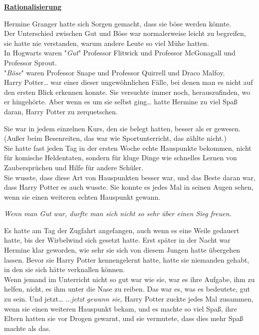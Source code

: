 

\hypertarget{rationalisierung}{%

\textbf{\uline{Rationalisierung}}

Hermine Granger hatte sich Sorgen gemacht, dass sie böse werden könnte.\\ Der Unterschied zwischen Gut und Böse war normalerweise leicht zu begreifen, sie hatte nie verstanden, warum andere Leute so viel Mühe hatten.\\ In Hogwarts waren "\emph{Gut}" Professor Flitwick und Professor McGonagall und Professor Sprout.\\ "\emph{Böse}" waren Professor Snape und Professor Quirrell und Draco Malfoy.\\ Harry Potter… war einer dieser ungewöhnlichen Fälle, bei denen man es nicht auf den ersten Blick erkennen konnte. Sie versuchte immer noch, herauszufinden, wo er hingehörte. Aber wenn es um sie selbst ging… hatte Hermine zu viel Spaß daran, Harry Potter zu zerquetschen.

Sie war in jedem einzelnen Kurs, den sie belegt hatten, besser als er gewesen.\\ (Außer beim Besenreiten, das war wie Sportunterricht, das zählte nicht.)\\ Sie hatte fast jeden Tag in der ersten Woche echte Hauspunkte bekommen, nicht für komische Heldentaten, sondern für kluge Dinge wie schnelles Lernen von Zaubersprüchen und Hilfe für andere Schüler.\\ Sie wusste, dass diese Art von Hauspunkten besser war, und das Beste daran war, dass Harry Potter es auch wusste. Sie konnte es jedes Mal in seinen Augen sehen, wenn sie einen weiteren echten Hauspunkt gewann.

\emph{Wenn man Gut war, durfte man sich nicht so sehr über einen Sieg freuen.}

Es hatte am Tag der Zugfahrt angefangen, auch wenn es eine Weile gedauert hatte, bis der Wirbelwind sich gesetzt hatte. Erst später in der Nacht war Hermine klar geworden, wie sehr sie sich von diesem Jungen hatte übergehen lassen. Bevor sie Harry Potter kennengelernt hatte, hatte sie niemanden gehabt, in den sie sich hätte verknallen können.\\ Wenn jemand im Unterricht nicht so gut war wie sie, war es ihre Aufgabe, ihm zu helfen, nicht, es ihm unter die Nase zu reiben. Das war es, was es bedeutete, gut zu sein. Und jetzt… ..\emph{.jetzt gewann sie,} Harry Potter zuckte jedes Mal zusammen, wenn sie einen weiteren Hauspunkt bekam, und es machte so viel Spaß, ihre Eltern hatten sie vor Drogen gewarnt, und sie vermutete, dass dies mehr Spaß machte als das.

}
